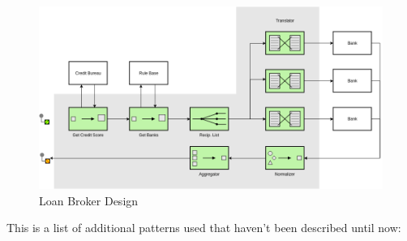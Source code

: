 \begin{figure} [H]
    \centering
    \includegraphics[width=1\textwidth]{images/SoftwareArchitecture/EAIloanbroken.png}
    \caption{Loan Broker Design}
    \label{fig:EAIloanbroken}
\end{figure}

This is a list of additional patterns used that haven't been described until now:

